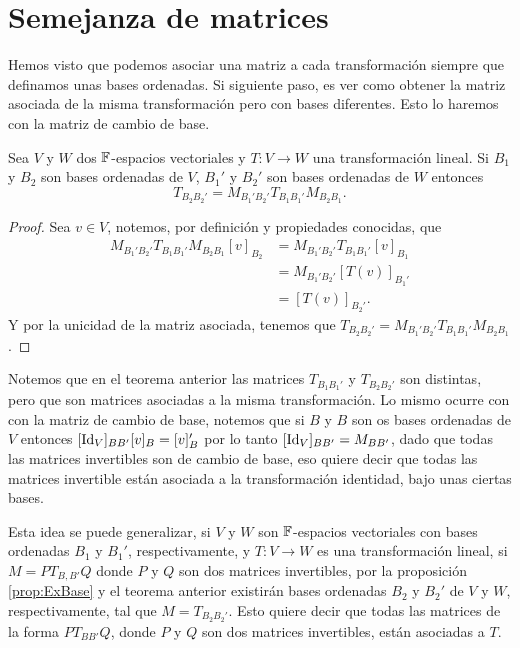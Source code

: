 \section{Semejanza de matrices}

Hemos visto que podemos asociar una matriz a cada transformación siempre que definamos unas bases ordenadas. Si siguiente paso, es ver como obtener la matriz asociada de la misma transformación pero con bases diferentes. Esto lo haremos con la matriz de cambio de base.

\begin{teor}
  Sea $V$ y $W$ dos $\mathbb{F}$-espacios vectoriales y $T \colon V \to W$ una transformación lineal. Si $B_1$ y $B_2$ son bases ordenadas de $V$, $B_1'$ y $B_2'$ son bases ordenadas de $W$ entonces
  \[T_{B_2 B_2'} = M_{B_1' B_2'} T_{B_1 B_1'}M_{B_2 B_1}. \]
\end{teor}
\begin{proof}
  Sea $v \in V$, notemos, por definición y propiedades conocidas, que
  \begin{align*}
    M_{B_1' B_2'} T_{B_1 B_1'}M_{B_2 B_1} [v]_{B_2} &= M_{B_1' B_2'} T_{B_1 B_1'} [v]_{B_1} \\
      &= M_{B_1' B_2'} [T(v)]_{B_1'} \\
      &= [T(v)]_{B_2'}.
  \end{align*}
  Y por la unicidad de la matriz asociada, tenemos que $T_{B_2 B_2'} = M_{B_1' B_2'} T_{B_1 B_1'}M_{B_2 B_1}$.
\end{proof}

Notemos que en el teorema anterior las matrices $T_{B_1B_1'}$ y $T_{B_2B_2'}$ son distintas, pero que son matrices asociadas a la misma transformación. Lo mismo ocurre con con la matriz de cambio de base, notemos que si $B$ y $B$ son os bases ordenadas de $V$ entonces $[\mathrm{Id}_V]_{BB'}[v]_B = [v]_B'$ por lo tanto $[\mathrm{Id}_V]_{BB'} = M_{BB'}$, dado que todas las matrices invertibles son de cambio de base, eso quiere decir que todas las matrices invertible están asociada a la transformación identidad, bajo unas ciertas bases.

Esta idea se puede generalizar, si $V$ y $W$ son $\mathbb{F}$-espacios vectoriales con bases ordenadas $B_1$ y $B_1'$, respectivamente, y $T\colon V \to W$ es una transformación lineal, si $M = PT_{B,B'}Q$ donde $P$ y $Q$ son dos matrices invertibles, por la proposición \ref{prop:ExBase} y el teorema anterior existirán bases ordenadas $B_2$ y $B_2'$ de $V$ y $W$, respectivamente, tal que $M = T_{B_2 B_2'}$. Esto quiere decir que todas las matrices de la forma $PT_{BB'}Q$, donde $P$ y $Q$ son dos matrices invertibles, están asociadas a $T$.

